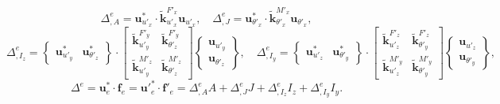 \documentclass[12pt,a4paper,article]{memoir} %
\begin{document}
\begin{equation}
  \Delta^e_{,A} = \mathbf{u}^*_{u'_x} \cdot \tilde{\mathbf{k}}_{u'_x}^{F'_x} \mathbf{u}_{u'_x}, \quad
  \Delta^e_{,J} = \mathbf{u}^*_{\theta'_x} \cdot \tilde{\mathbf{k}}_{\theta'_x}^{M'_x} \mathbf{u}_{\theta'_x},
\end{equation}
\begin{equation}
  \Delta^e_{,I_z} = \left\{ \begin{array}{cc} \mathbf{u}^*_{u'_y} & \mathbf{u}^*_{\theta'_z} \end{array} \right\} \cdot \left[ \begin{array}{cc} \tilde{\mathbf{k}}_{u'_y}^{F'_y} & \tilde{\mathbf{k}}_{\theta'_z}^{F'_y} \\ \tilde{\mathbf{k}}_{u'_y}^{M'_z} & \tilde{\mathbf{k}}_{\theta'_z}^{M'_z} \end{array} \right] \left\{ \begin{array}{c} \mathbf{u}_{u'_y} \\ \mathbf{u}_{\theta'_z} \end{array} \right\}, \quad
  \Delta^e_{,I_y} = \left\{ \begin{array}{cc} \mathbf{u}^*_{u'_z} & \mathbf{u}^*_{\theta'_y} \end{array} \right\} \cdot \left[ \begin{array}{cc} \tilde{\mathbf{k}}_{u'_z}^{F'_z} & \tilde{\mathbf{k}}_{\theta'_y}^{F'_z} \\ \tilde{\mathbf{k}}_{u'_z}^{M'_y} & \tilde{\mathbf{k}}_{\theta'_y}^{M'_y} \end{array} \right] \left\{ \begin{array}{c} \mathbf{u}_{u'_z} \\ \mathbf{u}_{\theta'_y} \end{array} \right\},
\end{equation}
\begin{equation}
  \Delta^e = \mathbf{u}^*_e \cdot \mathbf{f}_e = \mathbf{u}'^{*}_e \cdot \mathbf{f}'_e = \Delta^e_{,A} A + \Delta^e_{,J} J + \Delta^e_{,I_z} I_z + \Delta^e_{,I_y} I_y.
\end{equation}
\end{document}
